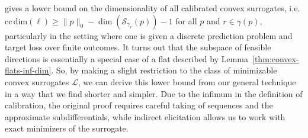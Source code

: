 \documentclass[anon,12pt]{colt2021} %
\newcommand{\Comments}{1}
\newcommand{\mynote}[2]{\ifnum\Comments=1\textcolor{#1}{#2}\fi}
\newcommand{\jessie}[1]{\mynote{purple}{[JF: #1]}}
\newcommand{\reals}{\mathbb{R}}
\newcommand{\ccdim}{\mathrm{cc\,dim}}
\newcommand{\rank}{\mathrm{rank}}
\newcommand{\zeros}[1]{\mathrm{ker}_\P\,#1}
\newcommand{\codim}{\mathrm{codim}}
\newcommand{\Pcodim}{\mathcal{P}\!\text{-}\mathrm{codim}}
\newcommand{\E}{\mathbb{E}}
\renewcommand{\L}{\mathcal{L}}
\newcommand{\R}{\mathcal{R}}
\renewcommand{\P}{\mathcal{P}}
\newcommand{\Sc}{\mathcal{S}}  %
\newcommand{\Y}{\mathcal{Y}}
\newcommand{\toto}{\rightrightarrows}
\begin{document}
\citet{ramaswamy2016convex} gives a lower bound on the dimensionality of all calibrated convex surrogates, i.e. $\ccdim(\ell) \geq \|p\|_0 - \dim(\Sc_{\gamma_r}(p)) - 1$ for all $p$ and $r \in \gamma(p)$, particularly in the setting where one is given a discrete prediction problem and target loss over finite outcomes.
It turns out that the subspace of feasible directions is essentially a special case of a flat described by Lemma~\ref{thm:convex-flats-inf-dim}.
So, by making a slight restriction to the class of minimizable convex surrogates $\L$, we can derive this lower bound from our general technique in a way that we find shorter and simpler.
Due to the infimum in the definition of calibration, the original proof requires careful taking of sequences and the approximate subdifferentials, while indirect elicitation allows us to work with exact minimizers of the surrogate.

%	
\end{document}
